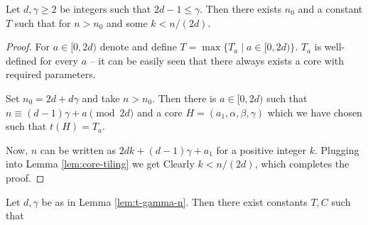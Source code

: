 \begin{lem}
\label{lem:t-gamma-n}

Let $d,\gamma \geq 2$ be integers such that $2d-1 \leq \gamma$. Then there exists $n_0$ and a constant $T$ such that
%
for $n > n_0$ and some $k < n/(2d)$.
\end{lem}
\begin{proof}
For $a \in [0,2d)$ denote
%
and define $T = \max \{T_a \mid a \in [0,2d)\}$. $T_a$ is well-defined for every $a$ -- it can be easily seen that there always exists a core with required parameters.

Set $n_0 = 2d+d\gamma$ and take $n > n_0$. Then there is $a \in [0,2d)$ such that $n \equiv (d-1)\gamma + a \pmod{2d}$ and a core $H=(a_1,\alpha,\beta,\gamma)$ which we have chosen such that $t(H) = T_a$.

Now, $n$ can be written as $2dk + (d-1)\gamma + a_1$ for a positive integer $k$. Plugging into Lemma \ref{lem:core-tiling} we get
%
Clearly $k < n/(2d)$, which completes the proof.
\end{proof}

\begin{cor}
\label{cor:log-t-gamma-n}
Let $d,\gamma$ be as in Lemma \ref{lem:t-gamma-n}. Then there exist constants $T,C$ such that
%
\end{cor}%

